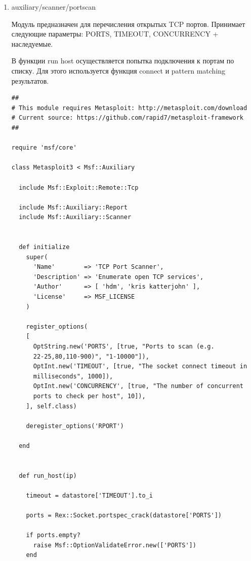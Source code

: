 \documentclass{article}
\begin{document}
\begin{enumerate}
\item auxiliary/scanner/portscan

Модуль предназначен для перечисления открытых TCP портов. Принимает следующие параметры: PORTS, TIMEOUT, CONCURRENCY + наследуемые.

В функции run host осуществляется попытка подключения к портам по списку. Для этого используется функция connect и pattern matching результатов.
\begin{verbatim}
##
# This module requires Metasploit: http://metasploit.com/download
# Current source: https://github.com/rapid7/metasploit-framework
##

require 'msf/core'

class Metasploit3 < Msf::Auxiliary

  include Msf::Exploit::Remote::Tcp

  include Msf::Auxiliary::Report
  include Msf::Auxiliary::Scanner


  def initialize
    super(
      'Name'        => 'TCP Port Scanner',
      'Description' => 'Enumerate open TCP services',
      'Author'      => [ 'hdm', 'kris katterjohn' ],
      'License'     => MSF_LICENSE
    )

    register_options(
    [
      OptString.new('PORTS', [true, "Ports to scan (e.g. 
      22-25,80,110-900)", "1-10000"]),
      OptInt.new('TIMEOUT', [true, "The socket connect timeout in 
      milliseconds", 1000]),
      OptInt.new('CONCURRENCY', [true, "The number of concurrent 
      ports to check per host", 10]),
    ], self.class)

    deregister_options('RPORT')

  end


  def run_host(ip)

    timeout = datastore['TIMEOUT'].to_i

    ports = Rex::Socket.portspec_crack(datastore['PORTS'])

    if ports.empty?
      raise Msf::OptionValidateError.new(['PORTS'])
    end


\end{verbatim}
\end{enumerate}
\end{document}
